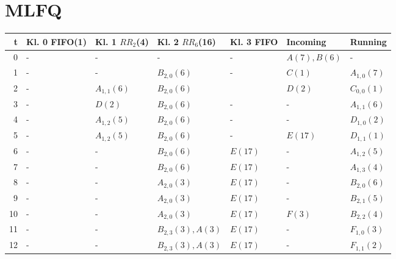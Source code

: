 \documentclass[a4paper, 11pt]{article}
\begin{document}
    \section{MLFQ}
    \begin{tabular}{r|l|l|l|l|l|l}
      t      & Kl. 0 FIFO(1)   & Kl. 1 $RR_2$(4)   & Kl. 2 $RR_6$(16)  & Kl. 3 FIFO      & Incoming     & Running   \\
      \hline
      0      & -               & -                             & -                  & -              & $A(7),B(6)$  &  -      \\
      1      & -               & -                             & $B_{2,0}(6)$       & -              & $C(1)$       & $A_{1,0}(7)$       \\
      2      & -               & $A_{1,1}(6)$                  & $B_{2,0}(6)$       &                & $D(2)$       & $C_{0,0}(1)$         \\
      3      & -               & $D(2)$                        & $B_{2,0}(6)$       & -              & -            & $A_{1,1}(6)$       \\
      4      & -               & $A_{1,2}(5)$                  & $B_{2,0}(6)$       & -              & -            & $D_{1,0}(2)$       \\
      5      & -               & $A_{1,2}(5)$                  & $B_{2,0}(6)$       & -              & $E(17)$      & $D_{1,1}(1)$       \\
      6      & -               & -                             & $B_{2,0}(6)$       & $E(17)$        & -            & $A_{1,2}(5)$       \\
      7      & -               & -                             & $B_{2,0}(6)$       & $E(17)$        & -            & $A_{1,3}(4)$       \\
      8      & -               & -                             & $A_{2,0}(3)$       & $E(17)$        & -            & $B_{2,0}(6)$       \\
      9      & -               & -                             & $A_{2,0}(3)$       & $E(17)$        & -            & $B_{2,1}(5)$       \\
      10     & -               & -                             & $A_{2,0}(3)$       & $E(17)$        & $F(3)$       & $B_{2,2}(4)$       \\
      11     & -               & -                             & $B_{2,3}(3),A(3)$  & $E(17)$        & -            & $F_{1,0}(3)$       \\
      12     & -               & -                             & $B_{2,3}(3),A(3)$  & $E(17)$        & -            & $F_{1,1}(2)$       \\

\end{tabular}
\end{document}
